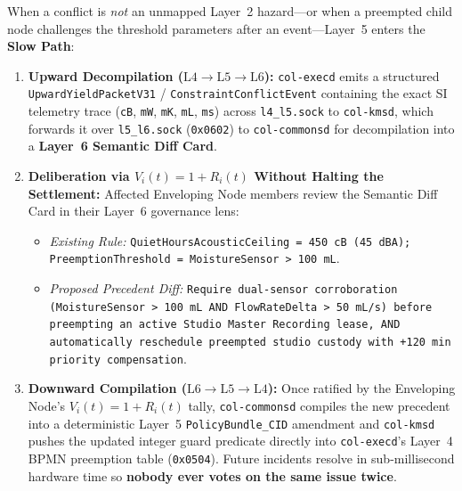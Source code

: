 When a conflict is \textit{not} an unmapped Layer~2 hazard---or when a preempted child node
challenges the threshold parameters after an event---Layer~5 enters the \textbf{Slow Path}:
\begin{enumerate}
\item \textbf{Upward Decompilation ($\mathrm{L4} \to \mathrm{L5} \to \mathrm{L6}$):}
        \texttt{col-execd} emits a structured \texttt{UpwardYieldPacketV31} /
        \texttt{ConstraintConflictEvent} containing the exact SI telemetry trace (\texttt{cB},
        \texttt{mW}, \texttt{mK}, \texttt{mL}, \texttt{ms}) across \texttt{l4\_l5.sock} to
        \texttt{col-kmsd}, which forwards it over \texttt{l5\_l6.sock} (\texttt{0x0602}) to
        \texttt{col-commonsd} for decompilation into a \textbf{Layer~6 Semantic Diff Card}.
\item \textbf{Deliberation via $V_i(t) = 1 + R_i(t)$ Without Halting the Settlement:} Affected
        Enveloping Node members review the Semantic Diff Card in their Layer~6 governance lens:
        \begin{itemize}
        \item \textit{Existing Rule:} \texttt{QuietHoursAcousticCeiling = 450 cB (45 dBA);
                PreemptionThreshold = MoistureSensor > 100 mL}.
        \item \textit{Proposed Precedent Diff:} \texttt{Require dual-sensor corroboration
                (MoistureSensor > 100 mL AND FlowRateDelta > 50 mL/s) before preempting an active
                Studio Master Recording lease, AND automatically reschedule preempted studio
                custody with +120 min priority compensation}.
        \end{itemize}
\item \textbf{Downward Compilation ($\mathrm{L6} \to \mathrm{L5} \to \mathrm{L4}$):} Once ratified
        by the Enveloping Node's $V_i(t) = 1 + R_i(t)$ tally, \texttt{col-commonsd} compiles the
        new precedent into a deterministic Layer~5 \texttt{PolicyBundle\_CID} amendment and
        \texttt{col-kmsd} pushes the updated integer guard predicate directly into
        \texttt{col-execd}'s Layer~4 BPMN preemption table (\texttt{0x0504}). Future incidents
        resolve in sub-millisecond hardware time so \textbf{nobody ever votes on the same issue
        twice}.
\end{enumerate}

